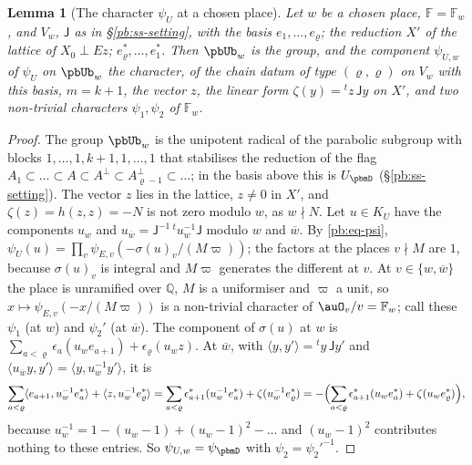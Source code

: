 \documentclass[10pt]{amsart}
\newtheorem{lemma}[theorem]{Lemma}
\theoremstyle{definition}
\theoremstyle{remark}
\newcommand{\Q}{\mathbb Q}
\providecommand{\auF}{\mathbb F}
\providecommand{\aubar}[1]{\overline{#1}}
\begin{document}
\begin{lemma}[The character $\psi_U$ at a chosen place]\label{pbm:chain}
Let $w$ be a chosen place, $\auF=\auF_w$, and $V_w$, $\mathsf J$ as in \S\ref{pb:ss-setting}, with
the basis $e_1,\dots,e_\varrho$; the reduction $X'$ of the lattice of $X_0\perp Ez$;
$e^*_\varrho,\dots,e^*_1$. Then $\pbUb_w$ is the group, and the component $\psi_{U,w}$ of $\psi_U$ on
$\pbUb_w$ the character, of the chain datum of type $(\varrho,\varrho)$ on $V_w$ with this basis,
$m=k+1$, the vector $z$, the linear form $\zeta(y)={}^tz\,\mathsf Jy$ on $X'$, and two non-trivial
characters $\psi_1,\psi_2$ of $\auF_w$.
\end{lemma}
\begin{proof}
The group $\pbUb_w$ is the unipotent radical of the parabolic subgroup with blocks $1,\dots,1,k+1,1,
\dots,1$ that stabilises the reduction of the flag $A_1\subset\dots\subset A\subset A^\perp\subset
A_{\varrho-1}^\perp\subset\dots$; in the basis above this is $U_\pbmD$ (\S\ref{pb:ss-setting}). The
vector $z$ lies in the lattice, $z\ne0$ in $X'$, and $\zeta(z)=h(z,z)=-N$ is not zero modulo $w$,
as $w\nmid N$. Let $u\in K_U$ have the components $u_w$ and $u_{\aubar w}=\mathsf J^{-1}\,{}^tu_w^{-1}
\mathsf J$ modulo $w$ and $\aubar w$. By \eqref{pb:eq-psi}, $\psi_U(u)=\prod_v\psi_{E,v}(-\sigma(u)_v/
(M\varpi))$; the factors at the places $v\nmid M$ are $1$, because $\sigma(u)_v$ is integral and
$M\varpi$ generates the different at $v$. At $v\in\{w,\aubar w\}$ the place is unramified over $\Q$,
$M$ is a uniformiser and $\varpi$ a unit, so $x\mapsto\psi_{E,v}(-x/(M\varpi))$ is a non-trivial
character of $\auO_v/v=\auF_w$; call these $\psi_1$ (at $w$) and $\psi_2'$ (at $\aubar w$). The
component of $\sigma(u)$ at $w$ is $\sum_{a<\varrho}\epsilon_a(u_we_{a+1})+\epsilon_\varrho(u_wz)$.
At $\aubar w$, with $\langle y,y'\rangle={}^ty\,\mathsf Jy'$ and $\langle u_{\aubar w}y,y'\rangle=
\langle y,u_w^{-1}y'\rangle$, it is
\[
\sum_{a<\varrho}\langle e_{a+1},u_w^{-1}e_a^*\rangle+\langle z,u_w^{-1}e_\varrho^*\rangle=\sum_{a<\varrho}
\epsilon^*_{a+1}(u_w^{-1}e_a^*)+\zeta(u_w^{-1}e^*_\varrho)=-\Bigl(\sum_{a<\varrho}\epsilon^*_{a+1}(u_we_a^*)+
\zeta(u_we^*_\varrho)\Bigr),
\]
because $u_w^{-1}=1-(u_w-1)+(u_w-1)^2-\dots$ and $(u_w-1)^2$ contributes nothing to these entries.
So $\psi_{U,w}=\psi_\pbmD$ with $\psi_2=\psi_2'^{-1}$.
\end{proof}
\end{document}
